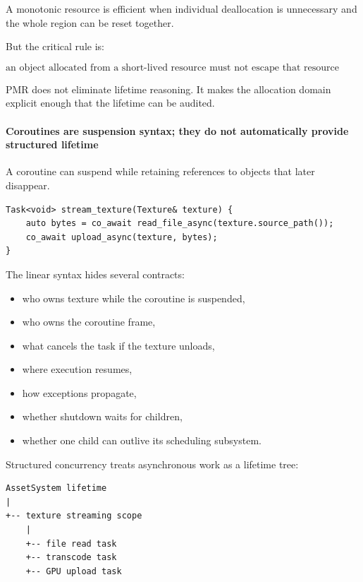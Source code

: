 A monotonic resource is efficient when individual deallocation is unnecessary and the whole region can be reset together.

But the critical rule is:

\[
\boxed{
\text{an object allocated from a short-lived resource must not escape that resource lifetime}
}
\]

PMR does not eliminate lifetime reasoning. It makes the allocation domain explicit enough that the lifetime can be audited.

\paragraph{Coroutines are suspension syntax; they do not automatically provide structured lifetime}\label{coroutines-are-suspension-syntax-they-do-not-automatically-provide-structured-lifetime}

A coroutine can suspend while retaining references to objects that later disappear.

\begin{verbatim}
Task<void> stream_texture(Texture& texture) {
    auto bytes = co_await read_file_async(texture.source_path());
    co_await upload_async(texture, bytes);
}
\end{verbatim}

The linear syntax hides several contracts:

\begin{itemize}
\tightlist
\item
  who owns texture while the coroutine is suspended,
\item
  who owns the coroutine frame,
\item
  what cancels the task if the texture unloads,
\item
  where execution resumes,
\item
  how exceptions propagate,
\item
  whether shutdown waits for children,
\item
  whether one child can outlive its scheduling subsystem.
\end{itemize}

Structured concurrency treats asynchronous work as a lifetime tree:

\begin{verbatim}
AssetSystem lifetime
|
+-- texture streaming scope
    |
    +-- file read task
    +-- transcode task
    +-- GPU upload task
\end{verbatim}

